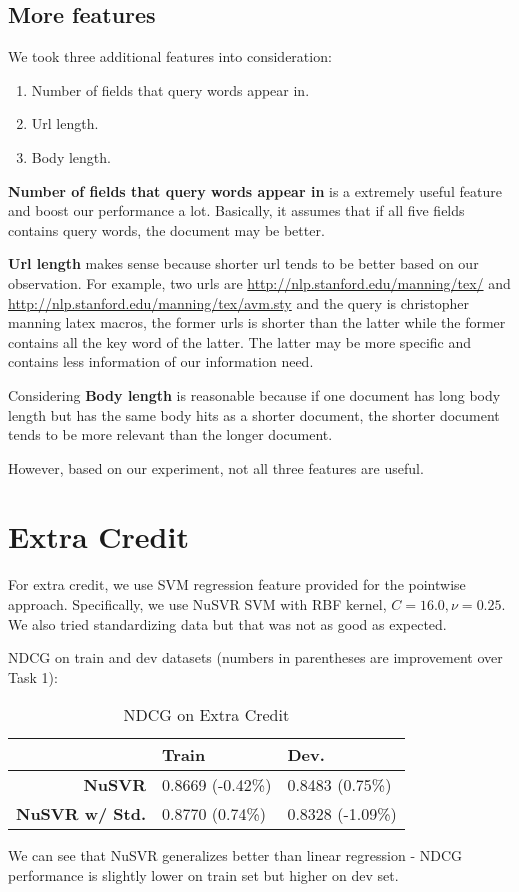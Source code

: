 \documentclass{article}
\begin{document}
\subsection{More features}

We took three additional features into consideration:

\begin{enumerate}
    \item Number of fields that query words appear in.
    \item Url length.
    \item Body length.
\end{enumerate}

\textbf{Number of fields that query words appear in} is a extremely useful feature and boost our performance a lot. Basically, it assumes that if all five fields contains query words, the document may be better.

\textbf{Url length} makes sense because shorter url tends to be better based on our observation. For example, two urls are \url{http://nlp.stanford.edu/manning/tex/} and \url{http://nlp.stanford.edu/manning/tex/avm.sty} and the query is christopher manning latex macros, the former urls is shorter than the latter while the former contains all the key word of the latter. The latter may be more specific and contains less information of our information need.

Considering \textbf{Body length} is reasonable because if one document has long body length but has the same body hits as a shorter document, the shorter document tends to be more relevant than the longer document.

However, based on our experiment, not all three features are useful.

\section{Extra Credit}

For extra credit, we use SVM regression feature provided for the pointwise approach.
Specifically, we use NuSVR SVM with RBF kernel, $C=16.0,\nu=0.25$. We also tried standardizing data but that was not as good as expected.

NDCG on train and dev datasets (numbers in parentheses are improvement over Task 1):

\begin{table}[!htb]
    \centering
    \begin{tabular}{| r | l | l |}
        \hline
        & \textbf{Train} & \textbf {Dev.} \\
        \hline
        \textbf{NuSVR} & 0.8669 (-0.42\%) & 0.8483 (0.75\%) \\
        \hline
        \textbf{NuSVR w/ Std.} & 0.8770 (0.74\%) & 0.8328 (-1.09\%) \\
        \hline
    \end{tabular}
    \caption{NDCG on Extra Credit}
\end{table}

We can see that NuSVR generalizes better than linear regression - NDCG performance is slightly lower on train set but higher on dev set.
\end{document}
